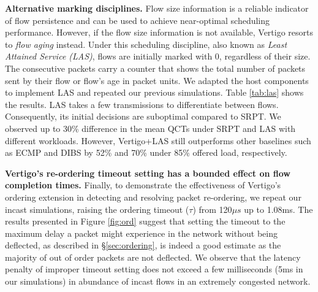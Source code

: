 \textbf{Alternative marking disciplines.}
Flow size information is a reliable indicator of flow persistence and can be used to achieve near-optimal scheduling performance. However, if the flow size information is not available, Vertigo resorts to \textit{flow aging} instead.
Under this scheduling discipline, also known as \textit{Least Attained Service (LAS)}, flows are initially marked with 0, regardless of their size. The consecutive packets carry a counter that shows the total number of packets sent by their flow or flow's age in packet units. We adapted the host components to implement LAS and repeated our previous simulations. Table \ref{tab:las} shows the results.
LAS takes a few transmissions to differentiate between flows. Consequently, its initial decisions are suboptimal compared to SRPT.  
We observed up to 30\% difference in the mean QCTs under SRPT and LAS with different workloads. However, Vertigo+LAS still outperforms other baselines such as ECMP and DIBS by 52\% and 70\% under 85\% offered load, respectively.

\textbf{Vertigo's re-ordering timeout setting has a bounded effect on flow completion times.}
Finally, to demonstrate the effectiveness of Vertigo's ordering extension in detecting and resolving packet re-ordering, we repeat our incast simulations, raising the ordering timeout ($\tau$) from 120$\mu s$ up to 1.08ms. The results presented in Figure \ref{fig:ord} suggest that setting the timeout to the maximum delay a packet might experience in the network without being deflected, as described in \S \ref{sec:ordering}, is indeed a good estimate as the majority of out of order packets are not deflected. We observe that the latency penalty of improper timeout setting does not exceed a few milliseconds (5ms in our simulations) in abundance of incast flows in an extremely congested network.

